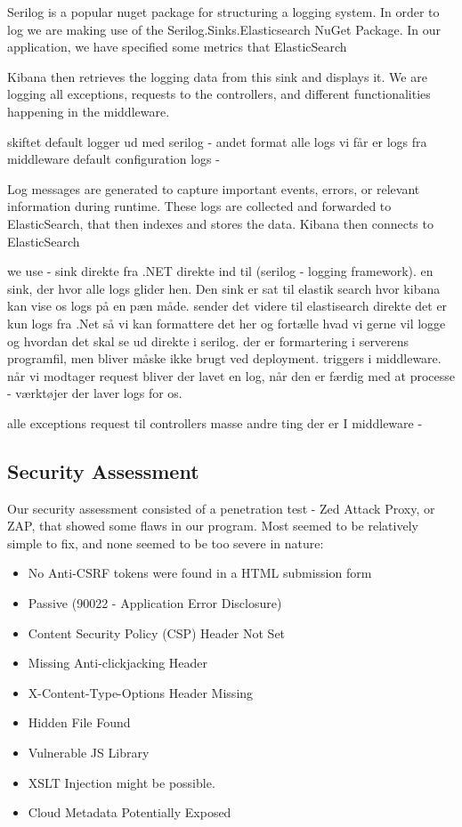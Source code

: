 Serilog is a popular nuget package for structuring a logging system.
In order to log we are making use of the Serilog.Sinks.Elasticsearch NuGet Package. In our application, we have specified some metrics that ElasticSearch 

Kibana then retrieves the logging data from this sink and displays it.
We are logging all exceptions, requests to the controllers, and different functionalities happening in the middleware. 

skiftet default logger ud med serilog - andet format 
alle logs vi får er logs fra middleware 
default configuration logs - 


Log messages are generated to capture important events, errors, or relevant information during runtime. These logs are collected and forwarded to ElasticSearch, that then indexes and stores the data. Kibana then connects to ElasticSearch 

we use - sink direkte fra .NET direkte ind til (serilog - logging framework). en sink, der hvor alle logs glider hen. Den sink er sat til elastik search hvor kibana kan vise os logs på en pæn måde.
sender det videre til elastisearch direkte
det er kun logs fra .Net så vi kan formattere det her og fortælle hvad vi gerne vil logge og hvordan det skal se ud direkte i serilog. 
der er formartering i serverens programfil, men bliver måske ikke brugt ved deployment. 
triggers i middleware. når vi modtager request bliver der lavet en log, når den er færdig med at processe - værktøjer der laver logs for os. 

alle exceptions
request til controllers
masse andre ting der er I middleware - 


\subsection{Security Assessment}

Our security assessment consisted of a penetration test - Zed Attack Proxy, or ZAP, that showed some flaws in our program. Most seemed to be relatively simple to fix, and none seemed to be too severe in nature:
\begin{itemize}
    \item No Anti-CSRF tokens were found in a HTML submission form
    \item Passive (90022 - Application Error Disclosure)
    \item Content Security Policy (CSP) Header Not Set
    \item Missing Anti-clickjacking Header
    \item X-Content-Type-Options Header Missing
    \item Hidden File Found
    \item Vulnerable JS Library
    \item XSLT Injection might be possible.
    \item Cloud Metadata Potentially Exposed
\end{itemize}

